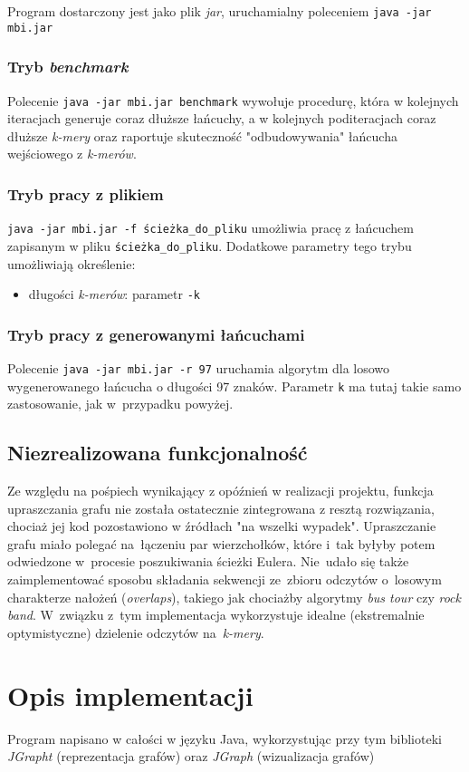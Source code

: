 \documentclass{article}
\begin{document}
Program dostarczony jest jako plik \textit{jar}, uruchamialny poleceniem \texttt{java -jar mbi.jar}
\subsubsection{Tryb \textit{benchmark}}
Polecenie \texttt{java -jar mbi.jar benchmark} wywołuje procedurę, która w kolejnych iteracjach generuje coraz dłuższe łańcuchy, a w kolejnych poditeracjach coraz dłuższe \textit{k-mery} oraz raportuje skuteczność "odbudowywania" łańcucha wejściowego z \textit{k-merów}.
\subsubsection{Tryb pracy z plikiem}
\texttt{java -jar mbi.jar -f ścieżka\_do\_pliku} umożliwia pracę z łańcuchem zapisanym w pliku \texttt{ścieżka\_do\_pliku}. Dodatkowe parametry tego trybu umożliwiają określenie:
\begin{itemize}
\item długości \textit{k-merów}: parametr \texttt{-k}
\end{itemize}
\subsubsection{Tryb pracy z generowanymi łańcuchami}
Polecenie \texttt{java -jar mbi.jar -r 97} uruchamia algorytm dla losowo wygenerowanego łańcucha o długości 97 znaków. Parametr \texttt{k} ma tutaj takie samo zastosowanie, jak w~przypadku powyżej.
\subsection{Niezrealizowana funkcjonalność}
Ze względu na pośpiech wynikający z opóźnień w realizacji projektu, funkcja upraszczania grafu nie została ostatecznie zintegrowana z resztą rozwiązania, chociaż jej kod pozostawiono w źródłach "na wszelki wypadek".
Upraszczanie grafu miało polegać na~łączeniu par wierzchołków, które i~tak byłyby potem odwiedzone w~procesie poszukiwania ścieżki Eulera.
Nie~udało się także zaimplementować sposobu składania sekwencji ze~zbioru odczytów o~losowym charakterze nałożeń (\textit{overlaps}), takiego jak chociażby algorytmy \textit{bus tour} czy \textit{rock band}. W~związku z~tym implementacja wykorzystuje idealne (ekstremalnie optymistyczne) dzielenie odczytów na~\textit{k-mery}.

\section{Opis implementacji}
Program napisano w całości w języku Java, wykorzystując przy tym biblioteki \textit{JGrapht} (reprezentacja grafów) oraz \textit{JGraph} (wizualizacja grafów)
\end{document}
